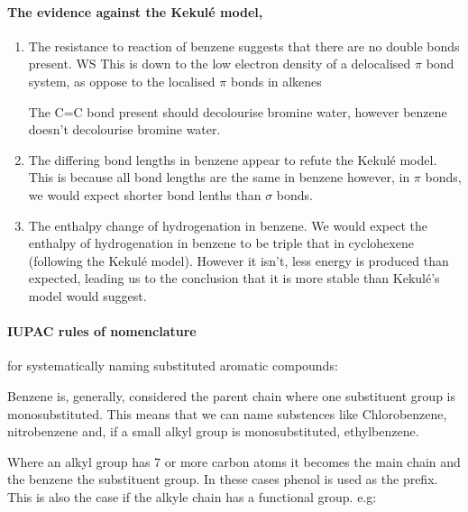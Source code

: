 	\paragraph{The evidence against the Kekul\'{e} model,}
	\begin{enumerate}
		\item The resistance to reaction of benzene suggests that there are no double bonds present.
		WS
	    This is down to the low electron density of a delocalised $\pi$ bond system, as oppose to the localised $\pi$ bonds in alkenes
		
		The C=C bond present should decolourise bromine water, however benzene doesn't decolourise bromine water.
		
		\item  The differing bond lengths in benzene appear to refute the Kekul\'{e} model.
		This is because all bond lengths are the same in benzene however, in $\pi$ bonds, we would expect shorter bond lenths than $\sigma$ bonds.
		
		\item The enthalpy change of hydrogenation in benzene. 
		We would expect the enthalpy of hydrogenation in benzene to be triple that in cyclohexene (following the Kekul\'{e} model).
		However it isn't, less energy is produced than expected, leading us to the conclusion that it is more stable than Kekul\'{e}'s model would suggest.
	\end{enumerate}
	
	\paragraph{IUPAC rules of nomenclature}  for systematically naming substituted aromatic compounds:
	
	Benzene is, generally, considered the parent chain where one substituent group is monosubstituted. 
	This means that we can name substences like Chlorobenzene, nitrobenzene and, if a small alkyl group is monosubstituted, ethylbenzene.
	
	Where an alkyl group has 7 or more carbon atoms it becomes the main chain and the benzene the substituent group. In these cases phenol is used as the prefix. This is also the case if the alkyle chain has a functional group. e.g:
	\begin{center}
	    \hspace{2cm}
	    \hspace{1.5cm}

        \vspace{2cm}	
	\end{center}
	
